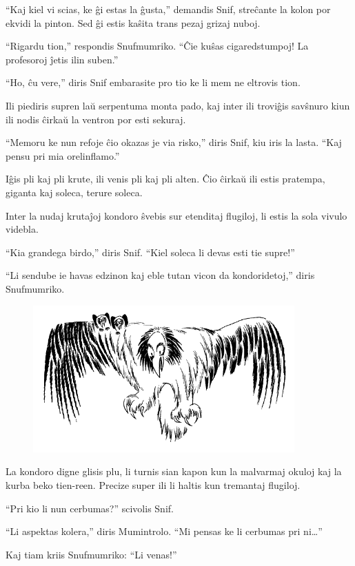 ``Kaj kiel vi scias, ke ĝi estas la ĝusta,'' demandis Snif, streĉante la kolon por ekvidi la pinton. Sed ĝi estis kaŝita trans pezaj grizaj nuboj.

``Rigardu tion,'' respondis Snufmumriko. ``Ĉie kuŝas cigaredstumpoj! La profesoroj ĵetis ilin suben.''

``Ho, ĉu vere,'' diris Snif embarasite pro tio ke li mem ne eltrovis tion.

Ili piediris supren laŭ serpentuma monta pado, kaj inter ili troviĝis savŝnuro kiun ili nodis ĉirkaŭ la ventron por esti sekuraj.

``Memoru ke nun refoje ĉio okazas je via risko,'' diris Snif, kiu iris la lasta. ``Kaj pensu pri mia orelinflamo.''

Iĝis pli kaj pli krute, ili venis pli kaj pli alten. Ĉio ĉirkaŭ ili estis pratempa, giganta kaj soleca, terure soleca.

Inter la nudaj krutaĵoj kondoro ŝvebis sur etenditaj flugiloj, li estis la sola vivulo videbla.

``Kia grandega birdo,'' diris Snif. ``Kiel soleca li devas esti tie supre!''

``Li sendube ie havas edzinon kaj eble tutan vicon da kondoridetoj,'' diris Snufmumriko.

\begin{figure}[htbp]
\centering
\includegraphics[width=284pt,height=160pt]{4-2.png}
\caption{}
\label{4-2}
\end{figure}

La kondoro digne glisis plu, li turnis sian kapon kun la malvarmaj okuloj kaj la kurba beko tien-reen. Precize super ili li haltis kun tremantaj flugiloj.

``Pri kio li nun cerbumas?'' scivolis Snif.

``Li aspektas kolera,'' diris Mumintrolo. ``Mi pensas ke li cerbumas pri ni{\ldots}''

Kaj tiam kriis Snufmumriko: ``Li venas!''

